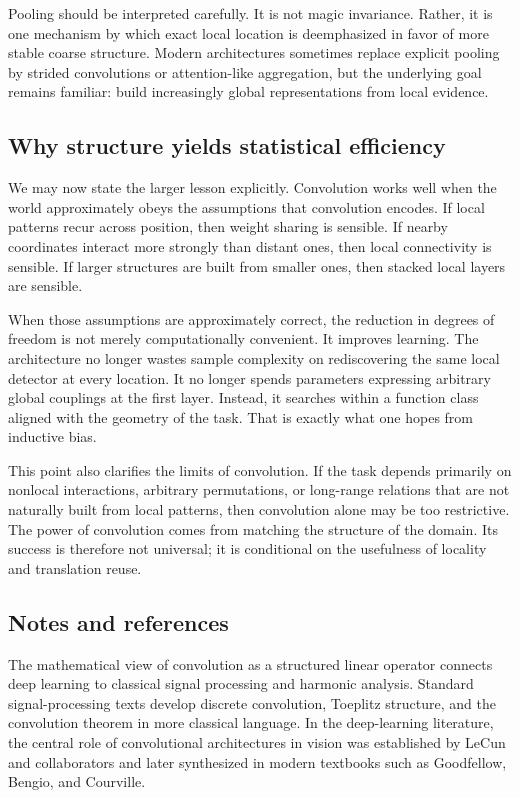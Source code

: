 \medskip

Pooling should be interpreted carefully.
It is not magic invariance.
Rather, it is one mechanism by which exact local location is deemphasized in favor of more stable coarse structure.
Modern architectures sometimes replace explicit pooling by strided convolutions or attention-like aggregation, but the underlying goal remains familiar: build increasingly global representations from local evidence.

\subsection*{Why structure yields statistical efficiency}

We may now state the larger lesson explicitly.
Convolution works well when the world approximately obeys the assumptions that convolution encodes.
If local patterns recur across position, then weight sharing is sensible.
If nearby coordinates interact more strongly than distant ones, then local connectivity is sensible.
If larger structures are built from smaller ones, then stacked local layers are sensible.

\medskip

When those assumptions are approximately correct, the reduction in degrees of freedom is not merely computationally convenient.
It improves learning.
The architecture no longer wastes sample complexity on rediscovering the same local detector at every location.
It no longer spends parameters expressing arbitrary global couplings at the first layer.
Instead, it searches within a function class aligned with the geometry of the task.
That is exactly what one hopes from inductive bias.

\medskip

This point also clarifies the limits of convolution.
If the task depends primarily on nonlocal interactions, arbitrary permutations, or long-range relations that are not naturally built from local patterns, then convolution alone may be too restrictive.
The power of convolution comes from matching the structure of the domain.
Its success is therefore not universal; it is conditional on the usefulness of locality and translation reuse.

\subsection*{Notes and references}

The mathematical view of convolution as a structured linear operator connects deep learning to classical signal processing and harmonic analysis.
Standard signal-processing texts develop discrete convolution, Toeplitz structure, and the convolution theorem in more classical language.
In the deep-learning literature, the central role of convolutional architectures in vision was established by LeCun and collaborators and later synthesized in modern textbooks such as Goodfellow, Bengio, and Courville.

